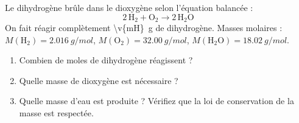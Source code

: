 Le dihydrogène brûle dans le dioxygène selon l'équation balancée :
\[ 2\,\text{H}_2 + \text{O}_2 \rightarrow 2\,\text{H}_2\text{O} \]
On fait réagir complètement \qty{\v{mH}}{g} de dihydrogène. Masses molaires : $M(\text{H}_2) = \qty{2.016}{g/mol}$, $M(\text{O}_2) = \qty{32.00}{g/mol}$, $M(\text{H}_2\text{O}) = \qty{18.02}{g/mol}$.

\begin{enumerate}[label=\alph*)]
    \item Combien de moles de dihydrogène réagissent ?
    \item Quelle masse de dioxygène est nécessaire ?
    \item Quelle masse d'eau est produite ? Vérifiez que la loi de conservation de la masse est respectée.
\end{enumerate}
